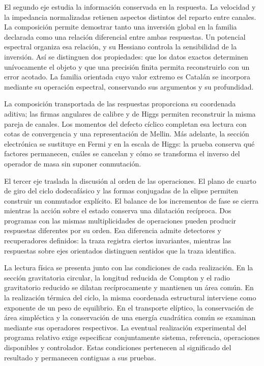 El segundo eje estudia la información conservada en la respuesta. La
velocidad y la impedancia normalizadas retienen aspectos distintos del
reparto entre canales. La composición permite demostrar tanto una inversión
global en la familia declarada como una relación diferencial entre ambas
respuestas. Un potencial espectral organiza esa relación, y su Hessiano
controla la sensibilidad de la inversión. Así se distinguen dos propiedades:
que los datos exactos determinen unívocamente el objeto y que una precisión
finita permita reconstruirlo con un error acotado. La familia orientada cuyo
valor extremo es Catalán se incorpora mediante su operación espectral,
conservando sus argumentos y su profundidad.

La composición transportada de las respuestas proporciona su coordenada
aditiva; las firmas angulares de calibre y de Higgs permiten reconstruir
la misma pareja de canales. Los momentos del defecto cíclico completan
esa lectura con cotas de convergencia y una representación de Mellin.
Más adelante, la sección electrónica se sustituye en Fermi y en la escala
de Higgs: la prueba conserva qué factores permanecen, cuáles se cancelan
y cómo se transforma el inverso del operador de masa sin suponer conmutación.

El tercer eje traslada la discusión al orden de las operaciones. El plano
de cuarto de giro del ciclo dodecafásico y las formas conjugadas de la
elipse permiten construir un conmutador explícito. El balance de los
incrementos de fase se cierra mientras la acción sobre el estado conserva
una dilatación recíproca. Dos programas con las mismas multiplicidades de
operaciones pueden producir respuestas diferentes por su orden. Esa
diferencia admite detectores y recuperadores definidos: la traza registra
ciertos invariantes, mientras las respuestas sobre ejes orientados
distinguen sentidos que la traza identifica.

La lectura física se presenta junto con las condiciones de cada
realización. En la sección gravitatoria circular, la longitud reducida
de Compton y el radio gravitatorio reducido se dilatan recíprocamente y
mantienen un área común. En la realización térmica del ciclo, la misma
coordenada estructural interviene como exponente de un peso de equilibrio.
En el transporte elíptico, la conservación de área simpléctica y la
conservación de una energía cuadrática común se examinan mediante sus
operadores respectivos. La eventual realización experimental del programa
relativo exige especificar conjuntamente sistema, referencia, operaciones
disponibles y controlador. Estas condiciones pertenecen al significado
del resultado y permanecen contiguas a sus pruebas.

